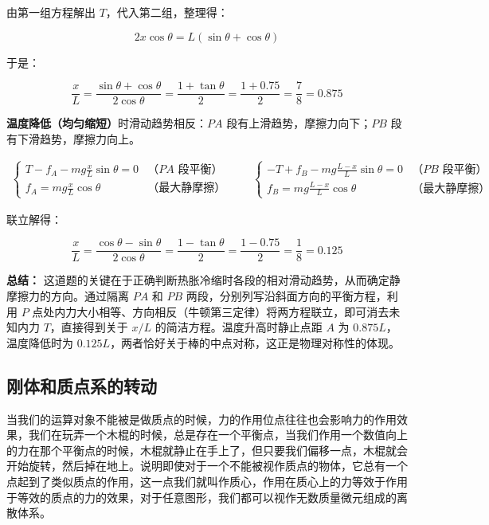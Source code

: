 \documentclass[UTF8]{ctexbook}
\begin{document}
由第一组方程解出 $T$，代入第二组，整理得：

\[
2x\cos\theta = L(\sin\theta + \cos\theta)
\]

于是：

\[
\boxed{\frac{x}{L} = \frac{\sin\theta + \cos\theta}{2\cos\theta} = \frac{1 + \tan\theta}{2} = \frac{1 + 0.75}{2} = \frac{7}{8} = 0.875}
\]

\textbf{温度降低（均匀缩短）}时滑动趋势相反：$PA$ 段有上滑趋势，摩擦力向下；$PB$ 段有下滑趋势，摩擦力向上。

\begin{gather*}
\begin{cases}
\displaystyle T - f_A - mg\frac{x}{L}\sin\theta = 0 & \text{（$PA$ 段平衡）} \\[8pt]
\displaystyle f_A = mg\frac{x}{L}\cos\theta & \text{（最大静摩擦）}
\end{cases}
\qquad
\begin{cases}
\displaystyle -T + f_B - mg\frac{L-x}{L}\sin\theta = 0 & \text{（$PB$ 段平衡）} \\[8pt]
\displaystyle f_B = mg\frac{L-x}{L}\cos\theta & \text{（最大静摩擦）}
\end{cases}
\end{gather*}

联立解得：

\[
\boxed{\frac{x}{L} = \frac{\cos\theta - \sin\theta}{2\cos\theta} = \frac{1 - \tan\theta}{2} = \frac{1 - 0.75}{2} = \frac{1}{8} = 0.125}
\]

\textbf{总结：} 这道题的关键在于正确判断热胀冷缩时各段的相对滑动趋势，从而确定静摩擦力的方向。通过隔离 $PA$ 和 $PB$ 两段，分别列写沿斜面方向的平衡方程，利用 $P$ 点处内力大小相等、方向相反（牛顿第三定律）将两方程联立，即可消去未知内力 $T$，直接得到关于 $x/L$ 的简洁方程。温度升高时静止点距 $A$ 为 $0.875L$，温度降低时为 $0.125L$，两者恰好关于棒的中点对称，这正是物理对称性的体现。



\subsection{刚体和质点系的转动}

当我们的运算对象不能被是做质点的时候，力的作用位点往往也会影响力的作用效果，我们在玩弄一个木棍的时候，总是存在一个平衡点，当我们作用一个数值向上的力在那个平衡点的时候，木棍就静止在手上了，但只要我们偏移一点，木棍就会开始旋转，然后掉在地上。说明即使对于一个不能被视作质点的物体，它总有一个点起到了类似质点的作用，这一点我们就叫作质心，作用在质心上的力等效于作用于等效的质点的力的效果，对于任意图形，我们都可以视作无数质量微元组成的离散体系。
\end{document}
